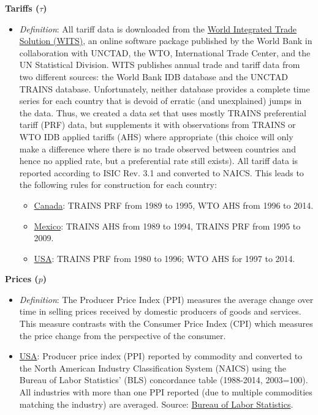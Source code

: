 \documentclass[11pt]{article}
\begin{document}
\begin{spacing}{1}

\noindent \textbf{Tariffs ($\tau$)}
	\begin{itemize}
	
	\item \emph{Definition}: All tariff data is downloaded from the \href{http://wits.worldbank.org/Default.aspx}{World Integrated Trade Solution (WITS)}, an online software package published by the World Bank in collaboration with UNCTAD, the WTO, International Trade Center, and the UN Statistical Division. WITS publishes annual trade and tariff data from two different sources: the World Bank IDB database and the UNCTAD TRAINS database. Unfortunately, neither database provides a complete time series for each country that is devoid of erratic (and unexplained) jumps in the data. Thus, we created a data set that uses mostly TRAINS preferential tariff (PRF) data, but supplements it with observations from TRAINS or WTO IDB applied tariffs (AHS) where appropriate (this choice will only make a difference where there is no trade observed between countries and hence no applied rate, but a preferential rate still exists). All tariff data is reported according to ISIC Rev. 3.1 and converted to NAICS. This leads to the following rules for construction for each country:
		\begin{itemize}
		\item \underline{Canada}: TRAINS PRF from 1989 to 1995, WTO AHS from 1996 to 2014.

		\item \underline{Mexico}: TRAINS AHS from 1989 to 1994, TRAINS PRF from 1995 to 2009.

		\item \underline{USA}: TRAINS PRF from 1980 to 1996; WTO AHS for 1997 to 2014.
		\end{itemize}
	\end{itemize}


\noindent \textbf{Prices ($p$)}
	\begin{itemize}
	
	\item \emph{Definition}: The Producer Price Index (PPI) measures the average change over time in selling prices received by domestic producers of goods and services. This measure contrasts with the Consumer Price Index (CPI) which measures the price change from the perspective of the consumer. 
	
	\item \underline{USA}: Producer price index (PPI) reported by commodity and converted to the North American Industry Classification System (NAICS) using the Bureau of Labor Statistics' (BLS) concordance table (1988-2014, 2003=100). All industries with more than one PPI reported (due to multiple commodities matching the industry) are averaged. Source: \href{http://www.bls.gov/ppi/#data}{Bureau of Labor Statistics}. %
		

\end{itemize}
\end{spacing}
\end{document}
